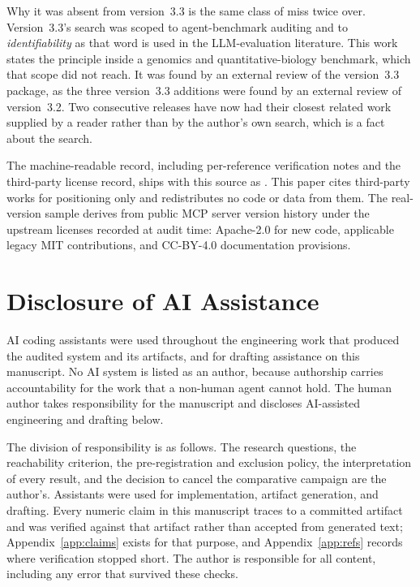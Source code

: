 \documentclass[11pt]{article}
\newcommand{\artifact}[1]{\path{#1}}
\begin{document}
Why it was absent from version~3.3 is the same class of miss twice over.
Version~3.3's search was scoped to agent-benchmark auditing and to
\emph{identifiability} as that word is used in the LLM-evaluation literature.
This work states the principle inside a genomics and quantitative-biology
benchmark, which that scope did not reach. It was found by an external review
of the version~3.3 package, as the three version~3.3 additions were found by an
external review of version~3.2. Two consecutive releases have now had their
closest related work supplied by a reader rather than by the author's own
search, which is a fact about the search.

The machine-readable record, including per-reference verification notes and
the third-party license record, ships with this source as
\artifact{REFERENCES_VERIFIED.json}. This paper cites third-party works for
positioning only and redistributes no code or data from them. The real-version
sample derives from public MCP server version history under the upstream
licenses recorded at audit time: Apache-2.0 for new code, applicable legacy
MIT contributions, and CC-BY-4.0 documentation provisions.

\section{Disclosure of AI Assistance}
\label{app:ai}

AI coding assistants were used throughout the engineering work that produced
the audited system and its artifacts, and for drafting assistance on this
manuscript. No AI system is listed as an author, because authorship carries
accountability for the work that a non-human agent cannot hold. The human
author takes responsibility for the manuscript and discloses AI-assisted
engineering and drafting below.

The division of responsibility is as follows. The research questions, the
reachability criterion, the pre-registration and exclusion policy, the
interpretation of every result, and the decision to cancel the comparative
campaign are the author's. Assistants were used for implementation, artifact
generation, and drafting. Every numeric claim in this manuscript traces to a
committed artifact and was verified against that artifact rather than accepted
from generated text; Appendix~\ref{app:claims} exists for that purpose, and
Appendix~\ref{app:refs} records where verification stopped short. The author is
responsible for all content, including any error that survived these checks.
\end{document}
